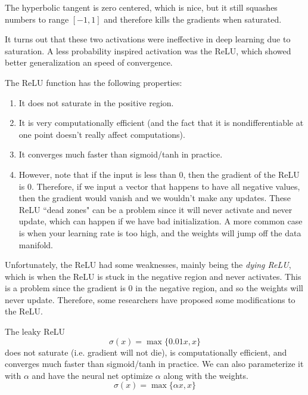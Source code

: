     \begin{definition}
      The hyperbolic tangent is zero centered, which is nice, but it still squashes numbers to range $[-1, 1]$ and therefore kills the gradients when saturated. 
    \end{definition}

    It turns out that these two activations were ineffective in deep learning due to saturation. A less probability inspired activation was the ReLU, which showed better generalization an speed of convergence. 

    \begin{definition}
      The ReLU function has the following properties: 
      \begin{enumerate}
          \item It does not saturate in the positive region. 
          \item It is very computationally efficient (and the fact that it is nondifferentiable at one point doesn't really affect computations). 
          \item It converges much faster than sigmoid/tanh in practice. 
          \item However, note that if the input is less than $0$, then the gradient of the ReLU is $0$. Therefore, if we input a vector that happens to have all negative values, then the gradient would vanish and we wouldn't make any updates. These ReLU ``dead zones" can be a problem since it will never activate and never update, which can happen if we have bad initialization. A more common case is when your learning rate is too high, and the weights will jump off the data manifold. 
      \end{enumerate}
    \end{definition}

    Unfortunately, the ReLU had some weaknesses, mainly being the \textit{dying ReLU}, which is when the ReLU is stuck in the negative region and never activates. This is a problem since the gradient is $0$ in the negative region, and so the weights will never update. Therefore, some researchers have proposed some modifications to the ReLU. 

    \begin{definition}
      The leaky ReLU 
      \begin{equation}
        \sigma(x) = \max\{0.01 x, x\}
      \end{equation}
      does not saturate (i.e. gradient will not die), is computationally efficient, and converges much faster than sigmoid/tanh in practice. We can also parameterize it with $\alpha$ and have the neural net optimize $\alpha$ along with the weights. 
      \begin{equation}
        \sigma(x) = \max\{\alpha x, x\}
      \end{equation}
    \end{definition}


